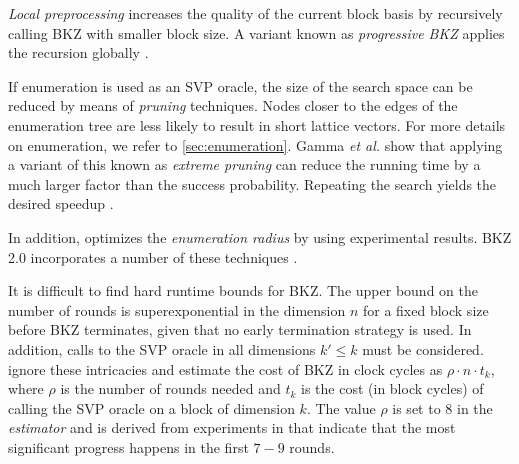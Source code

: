 \textit{Local preprocessing} increases the quality of the current block basis by recursively calling BKZ with smaller block size. A variant known as \textit{progressive BKZ} applies the recursion globally \cite{AWHT16}.

If enumeration is used as an SVP oracle, the size of the search space can be reduced by means of \textit{pruning} techniques. Nodes closer to the edges of the enumeration tree are less likely to result in short lattice vectors. For more details on enumeration, we refer to \cref{sec:enumeration}. Gamma \textit{et al.} show that applying a variant of this known as \textit{extreme pruning} can reduce the running time by a much larger factor than the success probability. Repeating the search yields the desired speedup \cite{GNR10}.

In addition, \cite{CN11} optimizes the \textit{enumeration radius} by using experimental results. BKZ 2.0 incorporates a number of these techniques \cite{CN11}.


It is difficult to find hard runtime bounds for BKZ. The upper bound on the number of rounds is superexponential in the dimension $n$ for a fixed block size \cite{HPS11a, GN08b} before BKZ terminates, given that no early termination strategy is used. In addition, calls to the SVP oracle in all dimensions $k' \leq k$ must be considered.
\citet{APS15} ignore these intricacies and estimate the cost of BKZ in clock cycles as $\rho \cdot n \cdot t_k$, where $\rho$ is the number of rounds needed and $t_k$ is the cost (in block cycles) of calling the SVP oracle on a block of dimension $k$. The value $\rho$ is set to $8$ in the \textit{estimator} and is derived from experiments in \cite{Chen13} that indicate that the most significant progress happens in the first $7-9$ rounds. \label{sec:bkz-8d}

